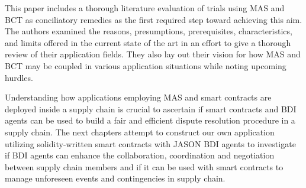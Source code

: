 \begin{itemize}
\vspace{.5cm}

This paper\cite{literature} includes a thorough literature evaluation of trials using \ac{MAS} and \ac{BCT} as conciliatory remedies as the first required step toward achieving this aim. The authors examined the reasons, presumptions, prerequisites, characteristics, and limits offered in the current state of the art in an effort to give a thorough review of their application fields. They also lay out their vision for how \ac{MAS} and \ac{BCT} may be coupled in various application situations while noting upcoming hurdles.
\end{itemize}

Understanding how applications employing \ac{MAS} and smart contracts are deployed inside a supply chain is crucial to ascertain if smart contracts and \ac{BDI} agents can be used to build a fair and efficient dispute resolution procedure in a supply chain. The next chapters attempt to construct our own application utilizing solidity-written smart contracts with JASON BDI agents to investigate if \ac{BDI} agents can enhance the collaboration, coordination and negotiation between supply chain members and if it can be used with smart contracts to manage unforeseen events and contingencies in supply chain.